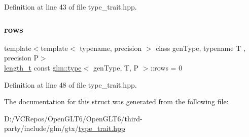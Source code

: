 Definition at line 43 of file type\+\_\+trait.\+hpp.

\mbox{\label{structglm_1_1type_a8bcdf3e3b3f2f67b70c456a6058fd300}} 
\subsubsection{\texorpdfstring{rows}{rows}}
{\footnotesize\ttfamily template$<$template$<$ typename, precision $>$ class gen\+Type, typename T , precision P$>$ \\
\mbox{\hyperlink{namespaceglm_a090a0de2260835bee80e71a702492ed9}{length\+\_\+t}} const \mbox{\hyperlink{structglm_1_1type}{glm\+::type}}$<$ gen\+Type, T, P $>$\+::rows = 0\hspace{0.3cm}{\ttfamily [static]}}



Definition at line 48 of file type\+\_\+trait.\+hpp.



The documentation for this struct was generated from the following file\+:\begin{DoxyCompactItemize}
\item 
D\+:/\+V\+C\+Repos/\+Open\+G\+L\+T6/\+Open\+G\+L\+T6/third-\/party/include/glm/gtx/\mbox{\hyperlink{type__trait_8hpp}{type\+\_\+trait.\+hpp}}\end{DoxyCompactItemize}
